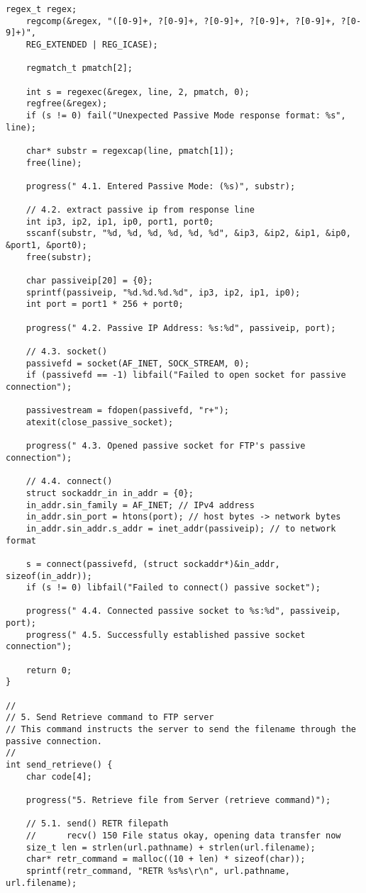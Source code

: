 \documentclass[subfiles]{main.tex}
\begin{document}
\begin{lstlisting}[style=C-sublime]
	regex_t regex;
	regcomp(&regex, "([0-9]+, ?[0-9]+, ?[0-9]+, ?[0-9]+, ?[0-9]+, ?[0-9]+)",
	REG_EXTENDED | REG_ICASE);
	
	regmatch_t pmatch[2];
	
	int s = regexec(&regex, line, 2, pmatch, 0);
	regfree(&regex);
	if (s != 0) fail("Unexpected Passive Mode response format: %s", line);
	
	char* substr = regexcap(line, pmatch[1]);
	free(line);
	
	progress(" 4.1. Entered Passive Mode: (%s)", substr);
	
	// 4.2. extract passive ip from response line
	int ip3, ip2, ip1, ip0, port1, port0;
	sscanf(substr, "%d, %d, %d, %d, %d, %d", &ip3, &ip2, &ip1, &ip0, &port1, &port0);
	free(substr);
	
	char passiveip[20] = {0};
	sprintf(passiveip, "%d.%d.%d.%d", ip3, ip2, ip1, ip0);
	int port = port1 * 256 + port0;
	
	progress(" 4.2. Passive IP Address: %s:%d", passiveip, port);
	
	// 4.3. socket()
	passivefd = socket(AF_INET, SOCK_STREAM, 0);
	if (passivefd == -1) libfail("Failed to open socket for passive connection");
	
	passivestream = fdopen(passivefd, "r+");
	atexit(close_passive_socket);
	
	progress(" 4.3. Opened passive socket for FTP's passive connection");
	
	// 4.4. connect()
	struct sockaddr_in in_addr = {0};
	in_addr.sin_family = AF_INET; // IPv4 address
	in_addr.sin_port = htons(port); // host bytes -> network bytes
	in_addr.sin_addr.s_addr = inet_addr(passiveip); // to network format
	
	s = connect(passivefd, (struct sockaddr*)&in_addr, sizeof(in_addr));
	if (s != 0) libfail("Failed to connect() passive socket");
	
	progress(" 4.4. Connected passive socket to %s:%d", passiveip, port);
	progress(" 4.5. Successfully established passive socket connection");
	
	return 0;
}

//
// 5. Send Retrieve command to FTP server
// This command instructs the server to send the filename through the passive connection.
//
int send_retrieve() {
	char code[4];
	
	progress("5. Retrieve file from Server (retrieve command)");
	
	// 5.1. send() RETR filepath
	//      recv() 150 File status okay, opening data transfer now
	size_t len = strlen(url.pathname) + strlen(url.filename);
	char* retr_command = malloc((10 + len) * sizeof(char));
	sprintf(retr_command, "RETR %s%s\r\n", url.pathname, url.filename);
	

\end{lstlisting}
\end{document}
